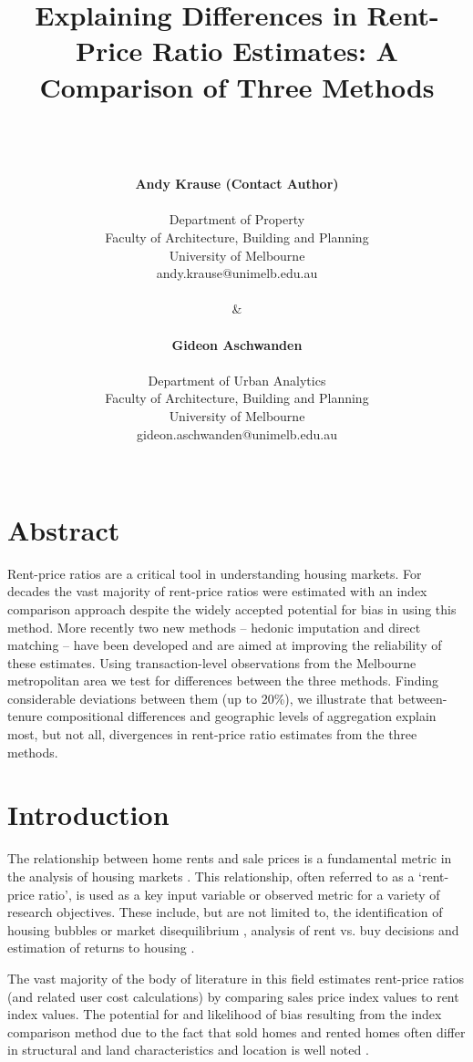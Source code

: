 \documentclass{article}\usepackage[]{graphicx}\usepackage[]{color}
\title{\textbf{Explaining Differences in Rent-Price Ratio Estimates: A Comparison of Three Methods}}
\author{\\
\\
\\
\textbf{Andy Krause (Contact Author)}\\
\\
Department of Property\\
Faculty of Architecture, Building and Planning\\
University of Melbourne\\
andy.krause@unimelb.edu.au\\
\\
\&\\
\\
\textbf{Gideon Aschwanden}\\
\\
Department of Urban Analytics\\
Faculty of Architecture, Building and Planning\\
University of Melbourne\\
gideon.aschwanden@unimelb.edu.au\\
\\
}
\begin{document}
\maketitle



\section*{Abstract}

Rent-price ratios are a critical tool in understanding housing markets. For decades the vast majority of rent-price ratios were estimated with an index comparison approach despite the widely accepted potential for bias in using this method. More recently two new methods -- hedonic imputation and direct matching -- have been developed and are aimed at improving the reliability of these estimates.  Using transaction-level observations from the Melbourne metropolitan area we test for differences between the three methods. Finding considerable deviations between them (up to 20\%), we illustrate that between-tenure compositional differences and geographic levels of aggregation explain most, but not all, divergences in rent-price ratio estimates from the three methods.\par   












\section*{Introduction}

The relationship between home rents and sale prices is a fundamental metric in the analysis of housing markets \citep*{shiller2007understanding, bracke2015house}. This relationship, often referred to as a `rent-price ratio', is used as a key input variable or observed metric for a variety of research objectives. These include, but are not limited to, the identification of housing bubbles or market disequilibrium \citep*{capozza1996expectations, Himmelberg2005, hill2016}, analysis of rent vs. buy decisions \citep*{beracha2012lessons} and estimation of returns to housing \citep*{gelain2014house, engsted2015predicting}.\par

The vast majority of the body of literature in this field estimates rent-price ratios (and related user cost calculations) by comparing sales price index values to rent index values. The potential for and likelihood of bias resulting from the index comparison method due to the fact that sold homes and rented homes often differ in structural and land characteristics and location is well noted \citep*{Himmelberg2005, glaeser2007arbitrage, verbrugge2008puzzling, garner2009reconciling}.\par 
\end{document}
